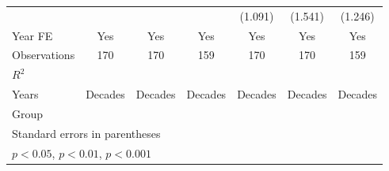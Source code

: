 \begin{table}[htbp]
\begin{tabular}{l*{6}{c}}
                &                  &                  &                  &  (1.091)         &  (1.541)         &  (1.246)         \\
\addlinespace
Year FE         &      Yes         &      Yes         &      Yes         &      Yes         &      Yes         &      Yes         \\
\midrule
Observations    &      170         &      170         &      159         &      170         &      170         &      159         \\
\(R^{2}\)       &                  &                  &                  &                  &                  &                  \\
Years           &  Decades         &  Decades         &  Decades         &  Decades         &  Decades         &  Decades         \\
Group           &                  &                  &                  &                  &                  &                  \\
\bottomrule
\multicolumn{7}{l}{\footnotesize Standard errors in parentheses}\\
\multicolumn{7}{l}{\footnotesize \sym{*} \(p<0.05\), \sym{**} \(p<0.01\), \sym{***} \(p<0.001\)}\\
\end{tabular}
\end{table}
